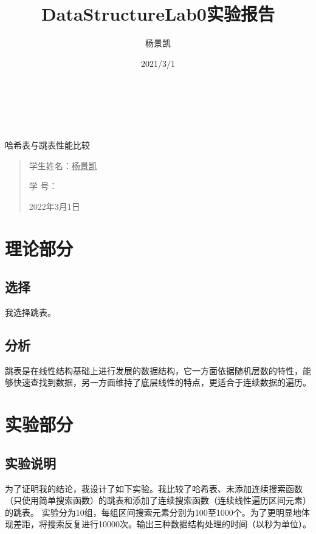 \documentclass[UTF8]{ctexart}
\date{}
\title{DataStructureLab0实验报告}
\author{杨景凯}
\date{2021/3/1}
\begin{document}
 
\begin{center}
    \quad \\
    \quad \\
    \quad \\
    \vskip 3.5cm
    \heiti {} 哈希表与跳表性能比较\\
\end{center}
\vskip 3.5cm
\begin{quotation}
    \songti \fontsize{30}{30}
    \doublespacing
    \par\setlength\parindent{12em}
    \quad 
\begin{center}

    学生姓名：\underline{\qquad    \quad \quad 杨景凯    \quad  \quad\qquad }

    学\hspace{0.61cm} 号：\underline{\quad \quad{}\quad\quad}

\end{center}
    
    \centering
    2022年3月1日
\end{quotation}
\clearpage
\tableofcontents
\clearpage
\section{理论部分}
\subsection{选择}
我选择跳表。
\subsection{分析}
跳表是在线性结构基础上进行发展的数据结构，它一方面依据随机层数的特性，能够快速查找到数据，另一方面维持了底层线性的特点，更适合于连续数据的遍历。
\section{实验部分}
\subsection{实验说明}
为了证明我的结论，我设计了如下实验。我比较了哈希表、未添加连续搜索函数（只使用简单搜索函数）的跳表和添加了连续搜索函数（连续线性遍历区间元素）的跳表。
实验分为10组，每组区间搜索元素分别为100至1000个。为了更明显地体现差距，将搜索反复进行10000次。输出三种数据结构处理的时间（以秒为单位）。
\end{document}
